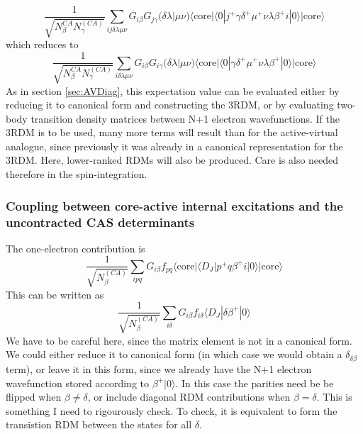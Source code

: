 \documentclass[a4paper,oneside,11pt]{article}
\numberwithin{equation}{section}
\newcommand{\DMETBra}{\langle \mathrm{core}|\langle 0|}
\newcommand{\DMETKet}{|0\rangle| \mathrm{core} \rangle}
\begin{document}
\begin{equation}
\frac{1}{\sqrt{N^{CA}_{\beta} N^{(CA)}_{\gamma}}} \sum_{ij \delta \lambda \mu \nu} G_{i \beta} G_{j \gamma} (\delta \lambda | \mu \nu) \DMETBra j^{+} \gamma \delta^{+} \mu^{+} \nu \lambda \beta^{+} i \DMETKet
\end{equation}
which reduces to
\begin{equation}
\frac{1}{\sqrt{N^{CA}_{\beta} N^{(CA)}_{\gamma}}} \sum_{i \delta \lambda \mu \nu} G_{i \beta} G_{i \gamma} (\delta \lambda | \mu \nu) \DMETBra \gamma \delta^{+} \mu^{+} \nu \lambda \beta^{+} \DMETKet
\end{equation}
As in section \ref{sec:AVDiag}, this expectation value can be evaluated either by reducing it to canonical form and constructing the 3RDM, or by evaluating two-body transition density matrices between
N+1 electron wavefunctions. If the 3RDM is to be used, many more terms will result than for the active-virtual analogue, since previously it was already in a canonical representation for the 3RDM.
Here, lower-ranked RDMs will also be produced. Care is also needed therefore in the spin-integration.

\subsubsection{Coupling between core-active internal excitations and the uncontracted CAS determinants}
The one-electron contribution is
\begin{equation}
\frac{1}{\sqrt{N^{(CA)}_{\beta}}} \sum_{ipq} G_{i \beta} f_{pq} \langle \textrm{core} | \langle D_J | p^{+} q \beta^{+} i \DMETKet
\end{equation}
This can be written as
\begin{equation}
\frac{1}{\sqrt{N^{(CA)}_{\beta}}} \sum_{i \delta} G_{i \beta} f_{i \delta} \langle D_J | \delta \beta^{+} | 0 \rangle
\end{equation}
We have to be careful here, since the matrix element is not in a canonical form. We could either reduce it to canonical form (in which case we would obtain a $\delta_{\delta \beta}$ term), or leave it in this
form, since we already have the N+1 electron wavefunction stored according to $\beta^{+} | 0 \rangle$. In this case the parities need be be flipped when $\beta \neq \delta$, or include diagonal RDM contributions
when $\beta = \delta$. This is something I need to rigourously check. To check, it is equivalent to form the transistion RDM between the states for all $\delta$.
\end{document}
